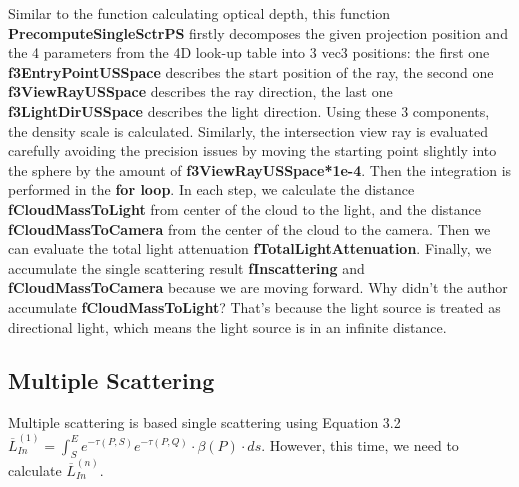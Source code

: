Similar to the function calculating optical depth, this function \textbf{PrecomputeSingleSctrPS} firstly decomposes the given projection position and the 4 parameters from the 4D look-up table into 3 vec3 positions: the first one \textbf{f3EntryPointUSSpace} describes the start position of the ray, the second one \textbf{f3ViewRayUSSpace} describes the ray direction, the last one \textbf{f3LightDirUSSpace} describes the light direction. Using these 3 components, the density scale is calculated. Similarly, the intersection view ray is evaluated carefully avoiding the precision issues by moving the starting point slightly into the sphere by the amount of \textbf{f3ViewRayUSSpace*1e-4}. Then the integration is performed in the \textbf{for loop}. In each step, we calculate the distance \textbf{fCloudMassToLight} from center of the cloud to the light, and the distance \textbf{fCloudMassToCamera} from the center of the cloud to the camera. Then we can evaluate the total light attenuation \textbf{fTotalLightAttenuation}. Finally, we accumulate the single scattering result \textbf{fInscattering} and \textbf{fCloudMassToCamera} because we are moving forward. Why didn't the author accumulate \textbf{fCloudMassToLight}? That's because the light source is treated as directional light, which means the light source is in an infinite distance.

\subsection{Multiple Scattering}
Multiple scattering is based single scattering using Equation 3.2 $\overline{L}^{(1)}_{In} = \int_{S}^{E}e^{-\tau(P,S)}e^{-\tau(P,Q)} \cdot \beta(P) \cdot ds$. However, this time, we need to calculate $\overline{L}^{(n)}_{In}$.
